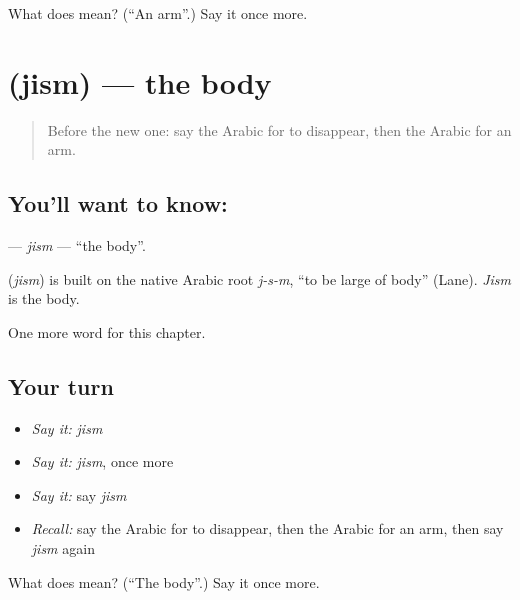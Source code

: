 \begin{tcolorbox}[breakable,colback=teal!4,colframe=teal!35!black,title={Before you move on}]
What does  mean? (\textquotedblleft{}An arm\textquotedblright{}.) Say it once more.
\end{tcolorbox}
\section[\texorpdfstring{\ar{جسم} (jism)}{جسم (jism)}]{ (jism) — the body}

\label{lesson:AR-C168-jism}



\begin{quote}
Before the new one: say the Arabic for to disappear, then the Arabic for an arm.
\end{quote}

\subsection*{You'll want to know: }
\textbf{} — \emph{jism} — \textquotedblleft{}the body\textquotedblright{}.

\begin{cousinweb}
\textbf{} (\emph{jism}) is built on the native Arabic root \emph{j-s-m}, \textquotedblleft{}to be large of body\textquotedblright{} (Lane). \emph{Jism} is the body.
\end{cousinweb}

\begin{grammarlens}[title={What you've built}]
One more word for this chapter.
\end{grammarlens}

\subsection*{Your turn}
\begin{itemize}
\raggedright
  \item \emph{Say it:} \emph{jism}
  \item \emph{Say it:} \emph{jism}, once more
  \item \emph{Say it:} say \emph{jism}
  \item \emph{Recall:} say the Arabic for to disappear, then the Arabic for an arm, then say \emph{jism} again
\end{itemize}

\begin{tcolorbox}[breakable,colback=teal!4,colframe=teal!35!black,title={Before you move on}]
What does  mean? (\textquotedblleft{}The body\textquotedblright{}.) Say it once more.
\end{tcolorbox}
